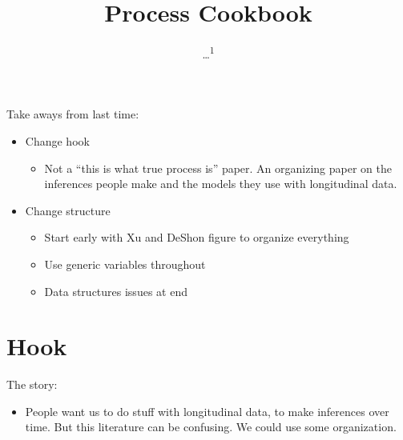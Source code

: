 \documentclass[english,,man]{apa6}
\title{Process Cookbook}
\author{\ldots{}\textsuperscript{1}}
\date{}
\affiliation{
\vspace{0.5cm}
\textsuperscript{1} ...}
\providecommand{\tightlist}{%
  \setlength{\itemsep}{0pt}\setlength{\parskip}{0pt}}
\theoremstyle{definition}
\theoremstyle{definition}
\theoremstyle{definition}
\theoremstyle{remark}
\begin{document}
\maketitle

Take aways from last time:

\begin{itemize}
\item
  Change hook

  \begin{itemize}
  \tightlist
  \item
    Not a \enquote{this is what true process is} paper. An organizing
    paper on the inferences people make and the models they use with
    longitudinal data.
  \end{itemize}
\item
  Change structure

  \begin{itemize}
  \item
    Start early with Xu and DeShon figure to organize everything
  \item
    Use generic variables throughout
  \item
    Data structures issues at end
  \end{itemize}
\end{itemize}

\hypertarget{hook}{%
\section{Hook}\label{hook}}

The story:

\begin{itemize}
\tightlist
\item
  People want us to do stuff with longitudinal data, to make inferences
  over time. But this literature can be confusing. We could use some
  organization.
\end{itemize}
\end{document}
